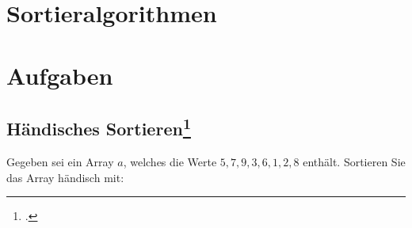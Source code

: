 \documentclass{lehramt-informatik}
\begin{document}

\chapter{Sortieralgorithmen}

\begin{quellen}
\cite{wiki:sortierverfahren}
\end{quellen}


\chapter{Aufgaben}

\section{Händisches Sortieren\footcite[Seite 1]{aud:pu:1}}

Gegeben sei ein Array $a$, welches die Werte $5,7,9,3,6,1,2,8$ enthält.
Sortieren Sie das Array händisch mit:
\end{document}
